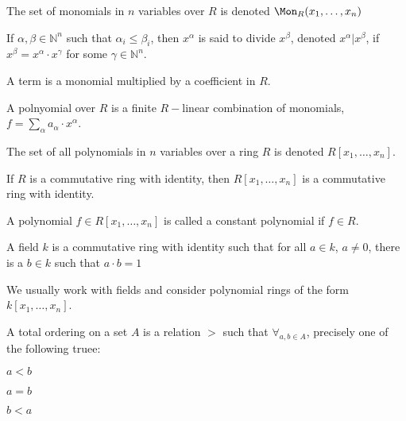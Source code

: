 \documentclass[crop=false,class=article,oneside]{standalone}
\begin{document}
        \begin{notation}
            The set of monomials in $n$ variables over
            $R$ is denoted $\Mon_{R}(x_1,\hdots, x_n)$
        \end{notation}
        \begin{definition}
            If $\alpha,\beta \in \mathbb{N}^n$ such that
            $\alpha_i \leq \beta_i$, then $x^{\alpha}$ is said
            to divide $x^\beta$, denoted $x^\alpha \vert x^\beta$,
            if $x^\beta = x^\alpha \cdot x^\gamma$ for some
            $\gamma\in\mathbb{N}^n$.
        \end{definition}
        \begin{definition}
            A term is a monomial multiplied by a coefficient in $R$.
        \end{definition}
        \begin{definition}
            A polnyomial over $R$ is a finite $R-$linear
            combination of monomials,
            $f=\sum_{\alpha} a_{\alpha}\cdot x^{\alpha}$.
        \end{definition}
        \begin{notation}
            The set of all polynomials in $n$ variables over
            a ring $R$ is denoted $R[x_1,\hdots, x_n]$.
        \end{notation}
        \begin{theorem}
            If $R$ is a commutative ring with identity,
            then $R[x_1,\hdots, x_n]$ is a commutative
            ring with identity.
        \end{theorem}
        \begin{definition}
            A polynomial $f\in R[x_1,\hdots, x_n]$ is
            called a constant polynomial if $f\in R$.
        \end{definition}
        \begin{definition}
            A field $k$ is a commutative ring with identity
            such that for all $a\in k$, $a\ne 0$, there is a
            $b\in k$ such that $a\cdot b=1$
        \end{definition}
        \begin{remark}
            We usually work with fields and consider
            polynomial rings of the form $k[x_1,\hdots ,x_n]$.
        \end{remark}
        \begin{definition}
            A total ordering on a set $A$ is a relation
            $>$ such that $\forall_{a,b\in A}$, precisely one
            of the following truee:
            \begin{enumerate}
                \begin{multicols}{3}
                    \item $a<b$
                    \item $a=b$
                    \item $b<a$
                \end{multicols}
            \end{enumerate}
        \end{definition}
\end{document}

